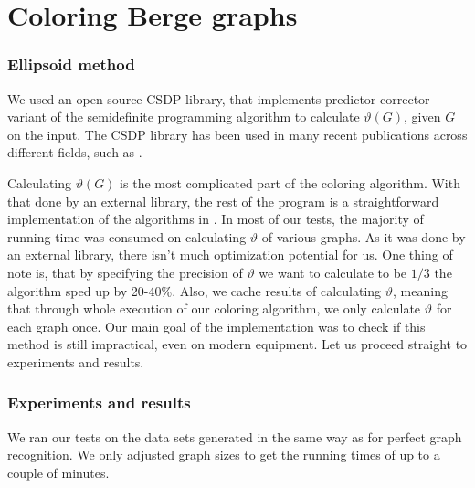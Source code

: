 \section{Coloring Berge graphs}

\subsubsection{Ellipsoid method}

We used an open source CSDP \cite{csdpRepo, csdp1999} library, that implements predictor corrector variant of the semidefinite programming algorithm to calculate $\vartheta(G)$, given $G$ on the input. The CSDP library has been used in many recent publications across different fields, such as \cite{Ampountolas_2017, Adasme_2011}.

Calculating $\vartheta(G)$ is the most complicated part of the coloring algorithm. With that done by an external library, the rest of the program is a straightforward implementation of the algorithms in . In most of our tests, the majority of running time was consumed on calculating $\vartheta$ of various graphs. As it was done by an external library, there isn't much optimization potential for us. One thing of note is, that by specifying the precision of $\vartheta$ we want to calculate to be $1/3$ the algorithm sped up  by 20-40\%. Also, we cache results of calculating $\vartheta$, meaning that through whole execution of our coloring algorithm, we only calculate $\vartheta$ for each graph once. Our main goal of the implementation was to check if this method is still impractical, even on modern equipment. Let us proceed straight to experiments and results.

\subsubsection{Experiments and results}

We ran our tests on the data sets generated in the same way as for perfect graph recognition. We only adjusted graph sizes to get the running times of up to a couple of minutes. 

